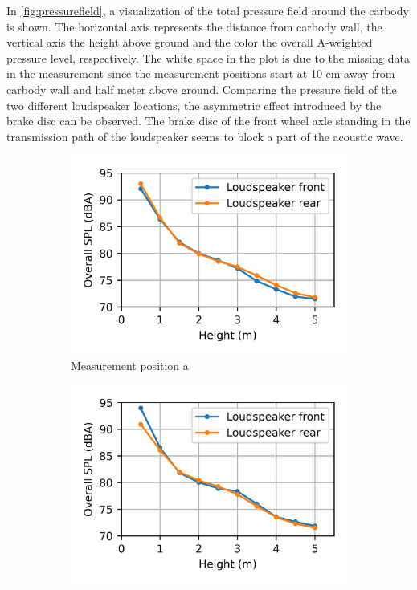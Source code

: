 \noindent In \cref{fig:pressurefield}, a visualization of the total pressure field around the carbody is shown. The horizontal axis represents the distance from carbody wall, the vertical axis the height above ground and the color the overall A-weighted pressure level, respectively. The white space in the plot is due to the missing data in the measurement since the measurement positions start at 10 cm away from carbody wall and half meter above ground. Comparing the pressure field of the two different loudspeaker locations, the asymmetric effect introduced by the brake disc can be observed. The brake disc of the front wheel axle standing in the transmission path of the loudspeaker seems to block a part of the acoustic wave.

\begin{figure}[H]
    \centering
     \begin{subfigure}[b]{0.48\textwidth}
        \centering
        \includegraphics{fig/pressure_over_height_pos_a.png}
        \caption{Measurement position a}
        \label{fig:SPLoverheight_pos_a}
    \end{subfigure}
    \begin{subfigure}[b]{0.48\textwidth}
        \centering
        \includegraphics{fig/pressure_over_height_pos_c.png}

\end{subfigure}
\end{figure}
